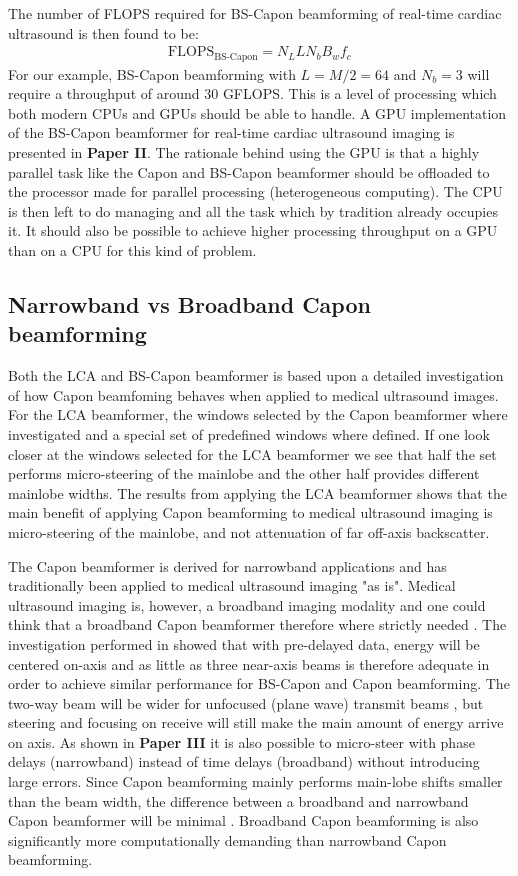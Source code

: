 The number of FLOPS required for BS-Capon beamforming of real-time cardiac ultrasound is then found to be:
\begin{align}
\text{FLOPS}_{\text{BS-Capon}} = N_LLN_bB_wf_c
\end{align}
For our example, BS-Capon beamforming with $L=M/2=64$ and $N_b=3$ will require a throughput of around $30$ GFLOPS. This is a level of processing which both modern CPUs and GPUs should be able to handle. A GPU implementation of the BS-Capon beamformer for real-time cardiac ultrasound imaging is presented in \textbf{Paper II}. The rationale behind using the GPU is that a highly parallel task like the Capon and BS-Capon beamformer should be offloaded to the processor made for parallel processing (heterogeneous computing). The CPU is then left to do managing and all the task which by tradition already occupies it. It should also be possible to achieve higher processing throughput on a GPU than on a CPU for this kind of problem.

\subsection{Narrowband vs Broadband Capon beamforming}
Both the LCA and BS-Capon beamformer is based upon a detailed investigation of how Capon beamfoming behaves when applied to medical ultrasound images. For the LCA beamformer, the windows selected by the Capon beamformer where investigated and a special set of predefined windows where defined. If one look closer at the windows selected for the LCA beamformer we see that half the set performs micro-steering of the mainlobe and the other half provides different mainlobe widths. The results from applying the LCA beamformer shows that the main benefit of applying Capon beamforming to medical ultrasound imaging is micro-steering of the mainlobe, and not attenuation of far off-axis backscatter.

The Capon beamformer is derived for narrowband applications and has traditionally been applied to medical ultrasound imaging "as is". Medical ultrasound imaging is, however, a broadband imaging modality and one could think that a broadband Capon beamformer therefore where strictly needed \cite{Holfort2009}. The investigation performed in \cite{Nilsen2009} showed that with pre-delayed data, energy will be centered on-axis and as little as three near-axis beams is therefore adequate in order to achieve similar performance for BS-Capon and Capon beamforming. The two-way beam will be wider for unfocused (plane wave) transmit beams \cite{Holfort2009, Austeng2011}, but steering and focusing on receive will still make the main amount of energy arrive on axis. As shown in \textbf{Paper III} it is also possible to micro-steer with phase delays (narrowband) instead of time delays (broadband) without introducing large errors. Since Capon beamforming mainly performs main-lobe shifts smaller than the beam width, the difference between a broadband and narrowband Capon beamformer will be minimal \cite{Diamantis2014}. Broadband Capon beamforming is also significantly more computationally demanding than narrowband Capon beamforming.

